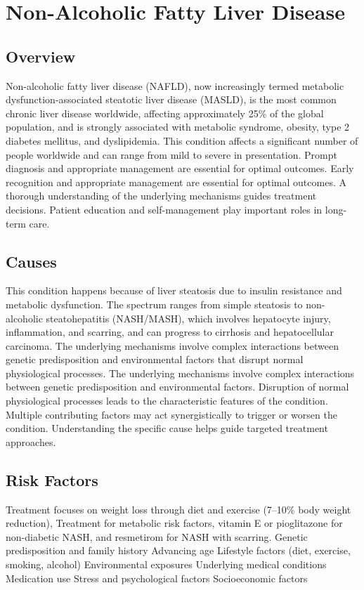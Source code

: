 \chapter{Non-Alcoholic Fatty Liver Disease}
\label{sec:Non-Alcoholic Fatty Liver Disease}

\section{Overview}
Non-alcoholic fatty liver disease (NAFLD), now increasingly termed metabolic dysfunction-associated steatotic liver disease (MASLD), is the most common chronic liver disease worldwide, affecting approximately 25\% of the global population, and is strongly associated with metabolic syndrome, obesity, type 2 diabetes mellitus, and dyslipidemia. This condition affects a significant number of people worldwide and can range from mild to severe in presentation. Prompt diagnosis and appropriate management are essential for optimal outcomes. Early recognition and appropriate management are essential for optimal outcomes. A thorough understanding of the underlying mechanisms guides treatment decisions. Patient education and self-management play important roles in long-term care.
\section{Causes}
This condition happens because of liver steatosis due to insulin resistance and metabolic dysfunction. The spectrum ranges from simple steatosis to non-alcoholic steatohepatitis (NASH/MASH), which involves hepatocyte injury, inflammation, and scarring, and can progress to cirrhosis and hepatocellular carcinoma. The underlying mechanisms involve complex interactions between genetic predisposition and environmental factors that disrupt normal physiological processes. The underlying mechanisms involve complex interactions between genetic predisposition and environmental factors. Disruption of normal physiological processes leads to the characteristic features of the condition. Multiple contributing factors may act synergistically to trigger or worsen the condition. Understanding the specific cause helps guide targeted treatment approaches.
\section{Risk Factors}
Treatment focuses on weight loss through diet and exercise (7--10\% body weight reduction), Treatment for metabolic risk factors, vitamin E or pioglitazone for non-diabetic NASH, and resmetirom for NASH with scarring. Genetic predisposition and family history Advancing age Lifestyle factors (diet, exercise, smoking, alcohol) Environmental exposures Underlying medical conditions Medication use Stress and psychological factors Socioeconomic factors

